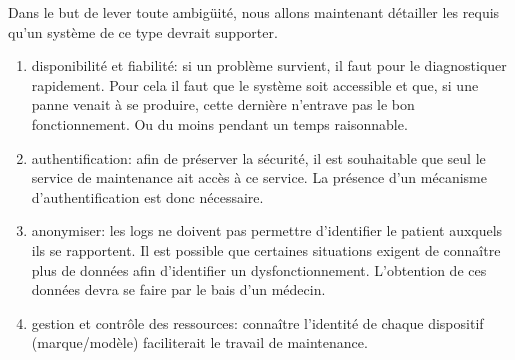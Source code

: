 Dans le but de lever toute ambigüité, nous allons maintenant détailler les requis qu'un système de ce type devrait supporter.
\begin{enumerate}
    \item disponibilité et fiabilité: si un problème survient, il faut pour le diagnostiquer rapidement. Pour cela il faut que le
    système soit accessible et que, si une panne venait à se produire, cette dernière n'entrave pas le bon fonctionnement. Ou du
    moins pendant un temps raisonnable.
    \item authentification: afin de préserver la sécurité, il est souhaitable que seul le service de maintenance ait accès à ce
    service. La présence d'un mécanisme d'authentification est donc nécessaire.
    \item anonymiser: les logs ne doivent pas permettre d'identifier le patient auxquels ils se rapportent. Il est possible que
    certaines situations exigent de connaître plus de données afin d'identifier un dysfonctionnement. L'obtention de ces données
    devra se faire par le bais d'un médecin.
    \item gestion et contrôle des ressources: connaître l'identité de chaque dispositif (marque/modèle) faciliterait le travail de
    maintenance.
\end{enumerate}
